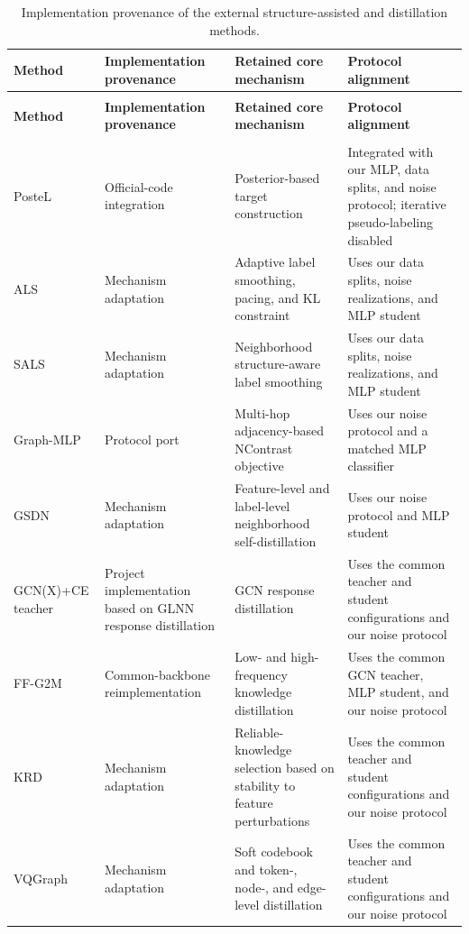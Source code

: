 \documentclass[preprint,12pt]{elsarticle}
\newlength{\TableWidth}
\begin{document}
\Needspace{335pt}
\begingroup
\fontsize{9.5}{12}\selectfont
\setlength{\tabcolsep}{3pt}
\renewcommand{\arraystretch}{1.18}
\setlength{\TableWidth}{\dimexpr\linewidth-6\tabcolsep\relax}
\begin{longtable}{@{}>{\raggedright\arraybackslash}p{\dimexpr 0.180000\TableWidth\relax}>{\raggedright\arraybackslash}p{\dimexpr 0.220000\TableWidth\relax}>{\raggedright\arraybackslash}p{\dimexpr 0.240000\TableWidth\relax}>{\raggedright\arraybackslash}p{\dimexpr 0.360000\TableWidth\relax}@{}}
\caption{Implementation provenance of the external structure-assisted and distillation methods.}\label{tab:G.1}\\
\toprule
\textbf{Method} & \textbf{Implementation provenance} & \textbf{Retained core mechanism} & \textbf{Protocol alignment} \\
\midrule\endfirsthead
\multicolumn{4}{l}{\small\itshape Table \thetable{} (continued)}\\
\toprule
\textbf{Method} & \textbf{Implementation provenance} & \textbf{Retained core mechanism} & \textbf{Protocol alignment} \\
\midrule\endhead
\midrule\multicolumn{4}{r}{\small\itshape Continued on the next page}\\\endfoot
\bottomrule\endlastfoot
PosteL & Official-code integration & Posterior-based target construction & Integrated with our MLP, data splits, and noise protocol; iterative pseudo-labeling disabled \\
ALS & Mechanism adaptation & Adaptive label smoothing, pacing, and KL constraint & Uses our data splits, noise realizations, and MLP student \\
SALS & Mechanism adaptation & Neighborhood structure-aware label smoothing & Uses our data splits, noise realizations, and MLP student \\
Graph-MLP & Protocol port & Multi-hop adjacency-based NContrast objective & Uses our noise protocol and a matched MLP classifier \\
GSDN & Mechanism adaptation & Feature-level and label-level neighborhood self-distillation & Uses our noise protocol and MLP student \\
GCN(X)+CE teacher & Project implementation based on GLNN response distillation & GCN response distillation & Uses the common teacher and student configurations and our noise protocol \\
FF-G2M & Common-backbone reimplementation & Low- and high-frequency knowledge distillation & Uses the common GCN teacher, MLP student, and our noise protocol \\
KRD & Mechanism adaptation & Reliable-knowledge selection based on stability to feature perturbations & Uses the common teacher and student configurations and our noise protocol \\
VQGraph & Mechanism adaptation & Soft codebook and token-, node-, and edge-level distillation & Uses the common teacher and student configurations and our noise protocol \\
\end{longtable}
\endgroup
\end{document}
